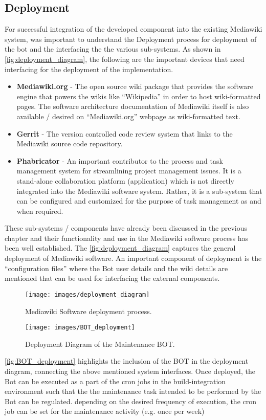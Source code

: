 \subsection{Deployment}
For successful integration of the developed component into the existing Mediawiki system, was important to understand the Deployment process for deployment of the bot and the interfacing the the various sub-systems. As shown in \autoref{fig:deployment_diagram}, the following are the important devices that need interfacing for the deployment of the implementation.  
\begin{itemize}
\item \textbf{Mediawiki.org} \cite{mediawiki} - The open source wiki package that provides the software engine that powers the wikis like \enquote{Wikipedia} in order to host wiki-formatted pages. The software architecture documentation of Mediawiki itself is also available / desired on \enquote{Mediawiki.org} webpage as wiki-formatted text.
\item \textbf{Gerrit} \cite{gerrit} - The version controlled code review system that links to the Mediawiki source code repository.
\item \textbf{Phabricator} \cite{wm-phab} - An important contributor to the process and task management system for streamlining project management issues. It is a stand-alone collaboration platform (application) which is not directly integrated into the Mediawiki software system. Rather, it is a sub-system that can be configured and customized for the purpose of task management as and when required.
\end{itemize}

These sub-systems / components have already been discussed in the previous chapter and their functionality and use in the Mediawiki software process has been well established. The \autoref{fig:deployment_diagram} captures the general deployment of Mediawiki software. An important component of deployment is the \enquote{configuration files} where the Bot user details and the wiki details are mentioned that can be used for interfacing the external components.
\begin{figure}[H]
  \centering
  \texttt{[image: images/deployment\_diagram]}
  \caption[Mediawiki Software deployment process]{Mediawiki Software deployment process.}\label{fig:deployment_diagram}
\end{figure} 
\begin{sidewaysfigure}[ht]
  \centering
  \texttt{[image: images/BOT\_deployment]}
  \caption[Deployment Diagram of the Maintenance BOT]{Deployment Diagram of the Maintenance BOT.}\label{fig:BOT_deployment}
\end{sidewaysfigure}
\autoref{fig:BOT_deployment} highlights the inclusion of the BOT in the deployment diagram, connecting the above mentioned system interfaces.
\newline Once deployed, the Bot can be executed as a part of the cron jobs in the build-integration environment such that the the maintenance task intended to be performed by the Bot can be regulated. depending on the desired frequency of execution, the cron job can be set for the maintenance activity (e.g. once per week)


